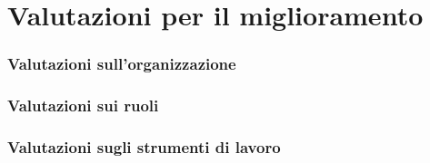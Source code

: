 \section{Valutazioni per il miglioramento}
\subsubsection{Valutazioni sull'organizzazione}
\subsubsection{Valutazioni sui ruoli}
\subsubsection{Valutazioni sugli strumenti di lavoro}